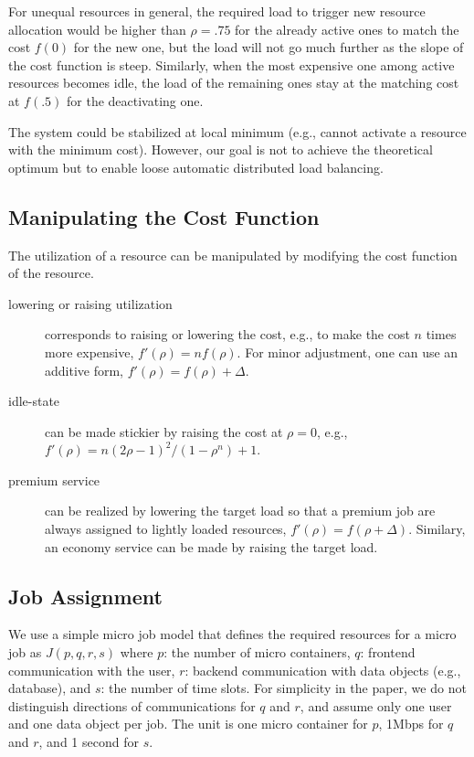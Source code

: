 For unequal resources in general, the required load to trigger new
resource allocation would be higher than $\rho = .75$ for the already
active ones to match the cost $f(0)$ for the new one, but the load
will not go much further as the slope of the cost function is steep.
Similarly, when the most expensive one among active resources becomes
idle, the load of the remaining ones stay at the matching cost at
$f(.5)$ for the deactivating one.

The system could be stabilized at local minimum (e.g., cannot activate
a resource with the minimum cost).
However, our goal is not to achieve the theoretical optimum but to
enable loose automatic distributed load balancing.

\subsection{Manipulating the Cost Function}
\label{sec:variation}

The utilization of a resource can be manipulated by modifying the cost
function of the resource.
\begin{description}
\item	[lowering or raising utilization] corresponds to raising or
	lowering the cost, e.g., to make the cost $n$ times
        more expensive, $f'(\rho) = n f(\rho)$.
        For minor adjustment, one can use an additive form,
        $f'(\rho) = f(\rho) + \Delta$.
\item	[idle-state] can be made stickier by raising the cost at
	  $\rho = 0$,
  	e.g., $f'(\rho) = n (2\rho - 1)^{2}/(1 - \rho^{n}) + 1$.
\item	[premium service] can be realized by lowering the target load so
        that a premium job are always assigned to lightly loaded resources, 
        $f'(\rho) = f(\rho + \Delta)$.
        Similary, an economy service can be made by raising the target load.
\end{description}

\subsection{Job Assignment}

We use a simple micro job model that defines the required resources
for a micro job as $J(p, q, r, s)$ where 
$p$: the number of micro containers, 
$q$: frontend communication with the user, 
$r$: backend communication with data objects (e.g., database), and
$s$: the number of time slots.
For simplicity in the paper, we do not distinguish directions of
communications for $q$ and $r$, and assume only one user and one data
object per job.
The unit is one micro container for $p$, 1Mbps for $q$ and $r$, and 1
second for $s$.

